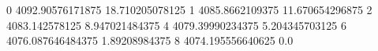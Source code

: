 0 4092.90576171875 18.710205078125
1 4085.8662109375 11.670654296875
2 4083.142578125 8.947021484375
4 4079.39990234375 5.204345703125
6 4076.087646484375 1.89208984375
8 4074.195556640625 0.0
